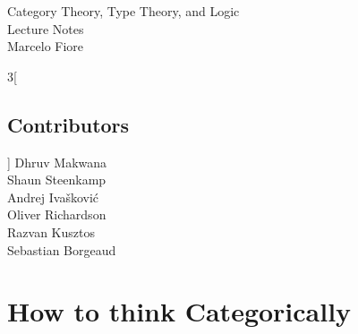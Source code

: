 \newcommand {\cat}{%
    \mathbf%
}
\newcommand {\domain}[1] {%
    \mathrm{dom}(#1)%
}
\newcommand {\codomain}[1] {%
    \mathrm{cod}(#1)%
}
\newcommand {\idarrow}[1][] {%
    \mathbf{1}{#1}%
}
\newcommand {\Cat}{%
    \cat {Cat}%
}
\newcommand {\Mon}{%
    \cat {Mon}%
}
\newcommand {\Poset}{%
    \cat {Poset}%
}
\newcommand {\Rel}{%
    \cat {Rel}%
}
\newcommand {\Sets}{%
    \cat {Sets}%
}
\newcommand {\Groups}{%
    \cat {Groups}%
}
\newcommand {\Graphs}{%
    \cat {Graphs}%
}

\newcommand{\ie}{\emph{i.e.}}
\newcommand{\etc}{\emph{etc.}}

\newcommand{\eqdef}{\stackrel{\text{def}}{=}} %
\newcommand{\comp}{\circ} %
\newcommand{\icomp}{\,} %

\newcommand{\setof}[1]{ \{ #1 \} }
\newcommand{\bigsetof}[1]{ \big\{ #1 \big\} }
\newcommand{\suchthat}{\mid}
\newcommand{\union}{\cup}

\newcommand{\nelem}[1]{ \mathbf{ #1 } }
\newcommand{\id}[1]{ \mathrm{id}_{ #1 } }
\newcommand{\nats}{\mathbb{N}}



\begin{center} {\LARGE \sc
Category Theory, Type Theory, and Logic\\
  Lecture Notes\\[4mm]}
  \Large Marcelo Fiore
\end{center}


\begin{multicols}{3}[\section*{Contributors}]
Dhruv Makwana\\ 
Shaun Steenkamp\\
Andrej Ivašković\\
Oliver Richardson\\
Razvan Kusztos\\
Sebastian Borgeaud\\
\end{multicols}
\clearpage


\tableofcontents

\newpage
\chapter{How to think Categorically}


